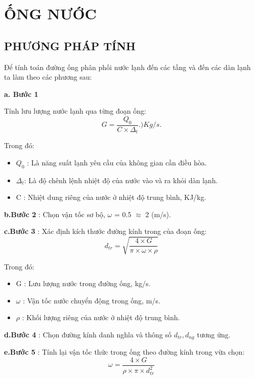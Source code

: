 \section{ỐNG NƯỚC}
\subsection{PHƯƠNG PHÁP TÍNH}
Để tính toán đường ống phân phối nước lạnh đến các tầng và đến các dàn lạnh ta làm theo các phương sau:

\textbf{a. Bước 1}

Tính lưu lượng nước lạnh qua từng đoạn ống:
\begin{equation*}
	G = \dfrac{Q_{0}}{C \times \Delta_{t}}. )Kg/s.
\end{equation*}

Trong đó:
\begin{itemize}
	\item $Q_{0}$ : Là năng suất lạnh yêu cầu của không gian cần điều hòa.
	\item $\Delta_{t}$: Là độ chênh lệnh nhiệt độ của nước vào và ra khỏi dàn lạnh.
	\item C : Nhiệt dung riêng của nước ở nhiệt độ trung bình, KJ/kg.
\end{itemize}

\textbf{b.Bước 2} : Chọn vận tốc sơ bộ, $\omega$ = 0.5 $\approx$ 2 (m/s).

\textbf{c.Bước 3} : Xác định kích thước đường kính trong của đoạn ống:
\begin{equation*}
	d_{tr} = \sqrt{\dfrac{4 \times G}{\pi \times \omega \times \rho }}
\end{equation*}

Trong đó:
\begin{itemize}
	\item G : Lưu lượng nước trong đường ống, kg/s.
	\item $\omega$ : Vận tốc nước chuyển động trong ống, m/s.
	\item $\rho$ : Khối lượng riêng của nước ở nhiệt độ trung bình.
\end{itemize}

\textbf{d.Bước 4} : Chọn đường kính danh nghĩa và thông số $d_{tr}, d_{ng}$ tương ứng.

\textbf{e.Bước 5} : Tính lại vận tốc thức trong ống theo đường kính trong vừa chọn:
\begin{equation*}
	\omega = \dfrac{4 \times G}{\rho \times \pi \times d_{tr}^{2}}
\end{equation*} 

